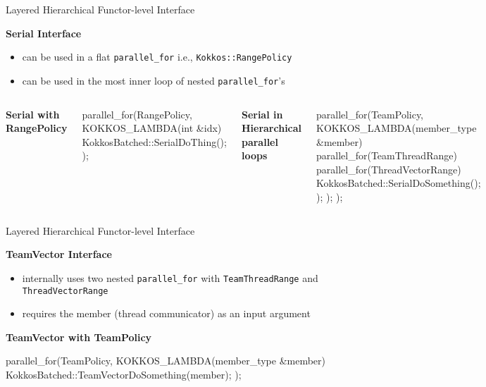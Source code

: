\begin{frame}[fragile]{Layered Hierarchical Functor-level Interface}

  {\bf Serial Interface}
  \begin{itemize}
  \item \small{can be used in a flat \verb|parallel_for| i.e., \verb|Kokkos::RangePolicy|}
  \item \small{can be used in the most inner loop of nested \verb|parallel_for|'s}
  \end{itemize}
  \begin{columns}[t,onlytextwidth]
  \textbf{\tiny{Serial with RangePolicy}}
  \begin{code}[frame=single, keywords={}, backgroundcolor=\color{brown!10}, basicstyle=\tiny, breaklines=true]
parallel_for(RangePolicy, 
 KOKKOS_LAMBDA(int &idx){
   KokkosBatched::SerialDoThing();
}); 
  \end{code}

  \textbf{\tiny{Serial in Hierarchical parallel loops}}
  \begin{code}[frame=single, keywords={}, backgroundcolor=\color{brown!10}, basicstyle=\tiny, breaklines=true]
parallel_for(TeamPolicy,
 KOKKOS_LAMBDA(member_type &member){
   parallel_for(TeamThreadRange) {
     parallel_for(ThreadVectorRange) {
       KokkosBatched::SerialDoSomething();
}); }); }); 
  \end{code}
  \end{columns}
\end{frame}

\begin{frame}[fragile]{Layered Hierarchical Functor-level Interface}

  {\bf TeamVector Interface}
  \begin{itemize}
  \item \small{internally uses two nested \verb|parallel_for| with \verb|TeamThreadRange| and \verb|ThreadVectorRange|}
  \item \small{requires the member (thread communicator) as an input argument}
  \end{itemize}
  \textbf{\tiny{TeamVector with TeamPolicy}}
  \begin{code}[frame=single, keywords={}, backgroundcolor=\color{brown!10}, basicstyle=\tiny, breaklines=true]
parallel_for(TeamPolicy, 
 KOKKOS_LAMBDA(member_type &member){
   KokkosBatched::TeamVectorDoSomething(member);
}); 
  \end{code}
\end{frame}

